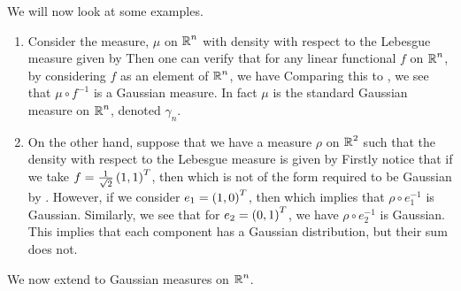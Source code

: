 \documentclass[../main.tex]{subfiles}
\begin{document}
\begin{example}
\label{ex:nd_gauss}
We will now look at some examples.
\begin{enumerate}
    \item Consider the measure, $\mu$ on $\operatorname{\mathbb{R}}^n$ with density with respect to the Lebesgue measure given by 
    Then one can verify that for any linear functional $f$ on $\operatorname{\mathbb{R}}^n$, by considering $f$ as an element of $\operatorname{\mathbb{R}}^n$, we have  Comparing this to , we see that $\mu\circ f^{-1}$ is a Gaussian measure. In fact $\mu$ is the standard Gaussian measure on $\operatorname{\mathbb{R}}^n$, denoted $\gamma_n$.
    \item On the other hand, suppose that we have a measure $\rho$ on $\operatorname{\mathbb{R}}^2$ such that the density with respect to the Lebesgue measure is given by 
    Firstly notice that if we take $f = \frac{1}{\sqrt{2}}\del{1,1}^T$, then  which is not of the form required to be Gaussian by . However, if we consider $e_1 = \del{1,0}^T$, then  which implies that $\rho\circ e_1^{-1}$ is Gaussian. Similarly, we see that for $e_2 = \del{0,1}^T$, we have $\rho\circ e_2^{-1}$ is Gaussian. This implies that each component has a Gaussian distribution, but their sum does not.
\end{enumerate}
\end{example}

We now extend  to Gaussian measures on $\operatorname{\mathbb{R}}^n$.
\end{document}
